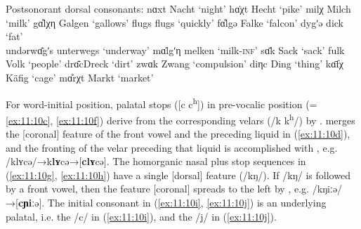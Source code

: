 \ea%
\label{ex:11:11}Postsonorant dorsal consonants:
\ea\label{ex:11:11a}  nɑxt \tab [nɑxt] \tab  Nacht \tab ‘night’ 
\ex\label{ex:11:11b}  hɑ̇χt \tab [hæçt] \tab  Hecht \tab ‘pike’ 
\ex\label{ex:11:11c}  milχ \tab [mɪlç] \tab  Milch \tab ‘milk’ 
\ex\label{ex:11:11d}  gɑ̊lχη \tab [kalçɲ̍] \tab  Galgen \tab ‘gallows’ 
\ex\label{ex:11:11e}  flugs \tab [flʊks] \tab  flugs \tab ‘quickly’ 
\ex\label{ex:11:11f}  fɑ̊lgə \tab [falkə] \tab Falke \tab ‘falcon’ 
\ex\label{ex:11:11g}  dygʹə \tab [tʏcə] \tab dick \tab ‘fat’ \\
     undərwɑ̇̄gʹs \tab [untəʀvæːcs] \tab  unterwegs \tab ‘underway’ 
\ex\label{ex:11:11h}  mɑ̇lgʹη \tab [mælcɲ̍] \tab melken \tab ‘milk\textsc{{}-inf}’ 
\ex\label{ex:11:11i}  sɑ̄k  \tab  Sack \tab ‘sack’ 
\ex\label{ex:11:11j}  fulk  \tab Volk \tab ‘people’ 
\ex\label{ex:11:11k}  drɑ̇̄c \tab  Dreck \tab ‘dirt’ 
\ex\label{ex:11:11l}  zwɑk  \tab Zwang \tab ‘compulsion’ 
\ex\label{ex:11:11m}  diηc  \tab Ding \tab ‘thing’ 
\ex\label{ex:11:11n}  kɑ̄fχ \tab  [kɑːfç] \tab  Käfig \tab  ‘cage’ 
\ex\label{ex:11:11o}  mɑ̊rχt \tab [maʀçt] \tab  Markt \tab ‘market’ 
    \z 
\z{}

For word-initial position, palatal stops ([c c\textsuperscript{h}]) in pre-vocalic position (=\ref{ex:11:10c}, \ref{ex:11:10f}) derive from the corresponding velars (/k k\textsuperscript{h}/) by .  merges the [coronal] feature of the front vowel and the preceding liquid in (\ref{ex:11:10d}), and the fronting of the velar preceding that liquid is accomplished with , e.g. /klʏcə/→{\textbar}k\textbf{lʏ}cə{\textbar}→[\textbf{clʏ}cə]. The homorganic nasal plus stop sequences in (\ref{ex:11:10g}, \ref{ex:11:10h}) have a single [dorsal] feature (/kŋ/). If /kŋ/ is followed by a front vowel, then the feature [coronal] spreads to the left by , e.g. /kŋiːə/→[\textbf{cɲiː}ə]. The initial consonant in (\ref{ex:11:10i}, \ref{ex:11:10j}) is an underlying palatal, i.e. the  /c/ in (\ref{ex:11:10i}), and the  /j/ in (\ref{ex:11:10j}).

